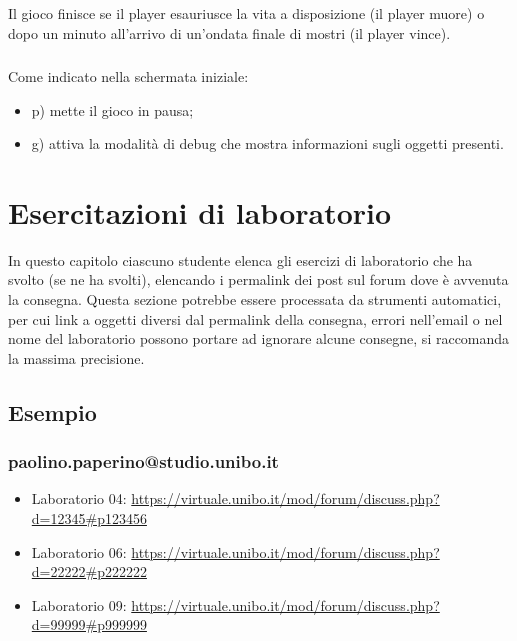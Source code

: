 \documentclass[a4paper,12pt]{report}
\begin{document}
\paragraph{}
Il gioco finisce se il player esauriusce la vita a disposizione (il player muore) o dopo un minuto all'arrivo di un'ondata finale di mostri (il player vince).
\paragraph{}
Come indicato nella schermata iniziale:
\begin{itemize}
\item p) mette il gioco in pausa;
\item g) attiva la modalità di debug che mostra informazioni sugli oggetti presenti.
\end{itemize}


\chapter{Esercitazioni di laboratorio}

In questo capitolo ciascuno studente elenca gli esercizi di laboratorio che ha svolto
(se ne ha svolti),
elencando i permalink dei post sul forum dove è avvenuta la consegna.
%
Questa sezione potrebbe essere processata da strumenti automatici,
per cui link a oggetti diversi dal permalink della consegna,
errori nell'email o nel nome del laboratorio possono portare ad ignorare alcune consegne,
si raccomanda la massima precisione.

\section*{Esempio}

\subsection{paolino.paperino@studio.unibo.it}

\begin{itemize}
	\item Laboratorio 04: \url{https://virtuale.unibo.it/mod/forum/discuss.php?d=12345#p123456}
	\item Laboratorio 06: \url{https://virtuale.unibo.it/mod/forum/discuss.php?d=22222#p222222}
	\item Laboratorio 09: \url{https://virtuale.unibo.it/mod/forum/discuss.php?d=99999#p999999}
\end{itemize}
\end{document}
